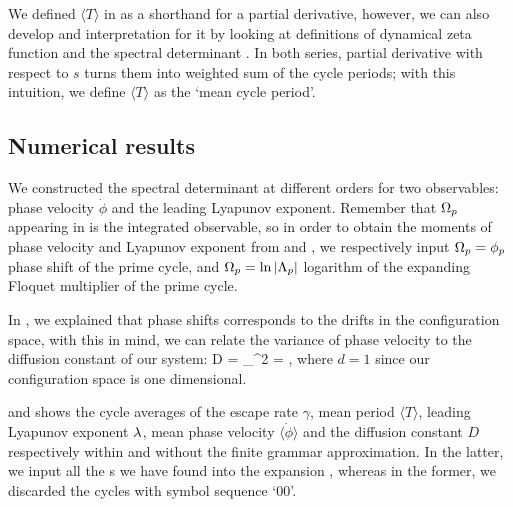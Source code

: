 {{{We defined $\langle T \rangle$ in  as a shorthand for a partial
derivative, however, we can also develop and interpretation for it by looking at
definitions of dynamical zeta function  and the spectral
determinant . In both series, partial derivative with
respect to $s$ turns them into weighted sum of the cycle periods; with this intuition,
we define $\langle T \rangle$ as the `mean cycle period'.

\subsection{Numerical results}
\label{s-NumResults}

We constructed the spectral determinant  at different
orders for two observables: phase velocity $\dot{\phi}$ and the leading Lyapunov
exponent. Remember that $\Omega_p$ appearing in  is the
integrated observable, so in order to obtain the moments of phase velocity and
Lyapunov exponent from  and , we respectively input
$\Omega_p = \phi_p$ phase shift of the prime cycle, and $\Omega_p = \ln |\Lambda_p|$ logarithm
of the expanding Floquet multiplier of the prime cycle.

In , we explained that  phase shifts corresponds to
the drifts in the configuration space, with this in mind, we can relate the
variance of phase velocity to the diffusion constant of our system:
\beq
    D =  \sigma_{\dot{\phi}}^2
      =  ,
\eeq
where $d=1$ since our configuration space is one dimensional.

 and  shows
the cycle averages of the escape rate $\gamma$, mean period $\langle T \rangle$,
leading Lyapunov exponent $\lambda$, mean phase velocity $\langle \dot{\phi} \rangle$
and the diffusion constant $D$ respectively within and without the finite grammar
approximation. In the latter, we input all the \rpo s we have found into the expansion
, whereas in the former, we discarded the cycles
with symbol sequence `00'.




}}}
